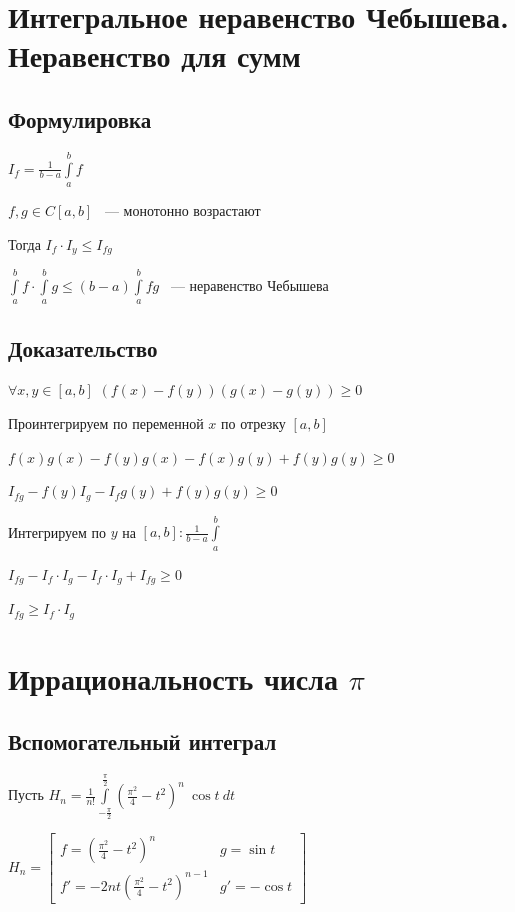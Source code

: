 \documentclass{article}
\begin{document}
	\section{Интегральное неравенство Чебышева. Неравенство для сумм}
	
		\subsection{Формулировка}
		
			$I_f = \frac{1}{b - a} \int\limits^b_a f$
		
			$f, g \in C[a, b]$ ~--- монотонно возрастают
			
			Тогда $I_f \cdot I_y \leq I_{fg}$
		
			$\int\limits^b_a f \cdot \int\limits^b_a g \leq (b - a) \int\limits^b_a fg$ ~--- неравенство Чебышева
		
		\subsection{Доказательство}
		
			$\forall x, y \in [a, b]$ $(f(x) - f(y))(g(x)-g(y)) \geq 0$
			
			Проинтегрируем по переменной $x$ по отрезку $[a, b]$
			
			$f(x)g(x) - f(y)g(x) - f(x)g(y) + f(y)g(y) \geq 0$
			
			$I_{fg} - f(y)I_g - I_f g(y) + f(y)g(y) \geq 0$
			
			Интегрируем по $y$ на $[a, b] : \frac{1}{b - a} \int\limits^b_a$
			
			$I_{fg} - I_f \cdot I_g - I_f \cdot I_g + I_{fg} \geq 0$
			
			$I_{fg} \geq I_f \cdot I_g$
	
	\newpage
	
	\section{Иррациональность числа $\pi$}
	
		\subsection{Вспомогательный интеграл}
		
			Пусть $H_n = \frac{1}{n!} \int\limits^{\frac{\pi}{2}}_{-\frac{\pi}{2}} (\frac{\pi^2}{4}-t^2)^n \ \cos t \ dt$
			
			$H_n = \begin{bmatrix} f = (\frac{\pi^2}{4} - t^2)^n & g = \sin t \\ f' = -2nt (\frac{\pi^2}{4} - t^2)^{n - 1} & g' = -\cos t \end{bmatrix}$
			
\end{document}
